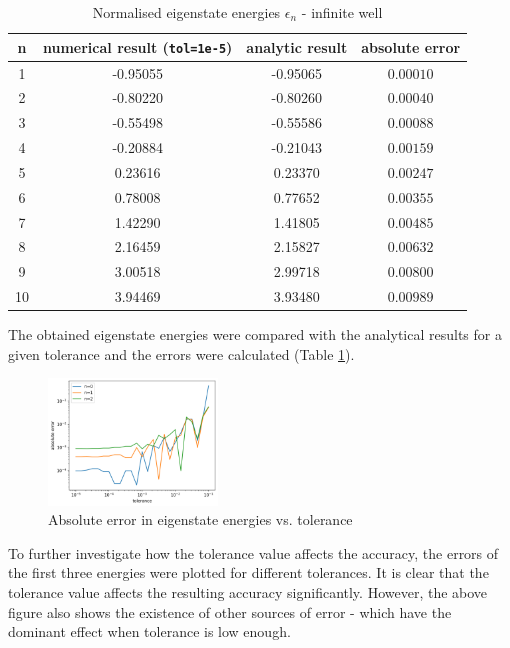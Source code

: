 \documentclass[11pt]{article}
\begin{document}
\begin{table}[h]
  \centering
  \caption{Normalised eigenstate energies $\epsilon_n$ - infinite well}
  \label{tab:1}
  \vspace{-.3cm}
  \begin{tabular}{c|c|c|c}
    n & numerical result (\texttt{tol=1e-5}) & analytic result & absolute error\\
    \hline
    1 & -0.95055 & -0.95065 & $0.00010$\\
    2 & -0.80220 & -0.80260 & $0.00040$\\
    3 & -0.55498 & -0.55586 & $0.00088$\\
    4 & -0.20884 & -0.21043 & $0.00159$\\
    5 &  0.23616 &  0.23370 & $0.00247$\\
    6 &  0.78008 &  0.77652 & $0.00355$\\
    7 &  1.42290 &  1.41805 & $0.00485$\\
    8 &  2.16459 &  2.15827 & $0.00632$\\
    9 &  3.00518 &  2.99718 & $0.00800$\\
    10 &  3.94469 &  3.93480 & $0.00989$

  \end{tabular}
\end{table}

The obtained eigenstate energies were compared with the analytical
results for a given tolerance and the errors were calculated
(Table \ref{tab:1}).

\begin{figure}
  \vspace{-1cm}
  \centering
  \captionsetup{width=0.4\textwidth}
  \includegraphics*[width=0.4\textwidth]{error_vs_tol.png}
  \vspace{-.3cm}
  \caption{Absolute error in eigenstate energies vs. tolerance}
\end{figure}

To further investigate how the tolerance 
value affects the accuracy, the errors of the first three energies were
plotted for different tolerances.
It is clear that the tolerance value affects the resulting accuracy significantly.
However, the above figure also shows the existence of other sources of error - 
which have the dominant effect when tolerance is low enough.
\end{document}
